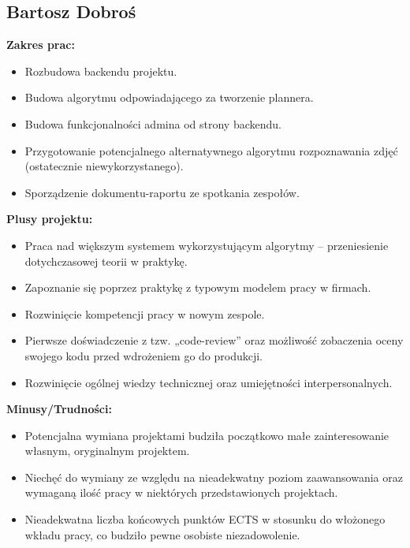 \documentclass[12pt,a4paper]{article}
\begin{document}
\subsection{Bartosz Dobroś}
\textbf{Zakres prac:}
\begin{itemize}
    \item Rozbudowa backendu projektu.
    \item Budowa algorytmu odpowiadającego za tworzenie plannera.
    \item Budowa funkcjonalności admina od strony backendu.
    \item Przygotowanie potencjalnego alternatywnego algorytmu rozpoznawania zdjęć (ostatecznie niewykorzystanego).
    \item Sporządzenie dokumentu-raportu ze spotkania zespołów.
\end{itemize}
\textbf{Plusy projektu:}
\begin{itemize}
    \item Praca nad większym systemem wykorzystującym algorytmy – przeniesienie dotychczasowej teorii w praktykę.
    \item Zapoznanie się poprzez praktykę z typowym modelem pracy w firmach.
    \item Rozwinięcie kompetencji pracy w nowym zespole.
    \item Pierwsze doświadczenie z tzw. „code-review” oraz możliwość zobaczenia oceny swojego kodu przed wdrożeniem go do produkcji.
    \item Rozwinięcie ogólnej wiedzy technicznej oraz umiejętności interpersonalnych.
\end{itemize}
\textbf{Minusy/Trudności:}
\begin{itemize}
    \item Potencjalna wymiana projektami budziła początkowo małe zainteresowanie własnym, oryginalnym projektem.
    \item Niechęć do wymiany ze względu na nieadekwatny poziom zaawansowania oraz wymaganą ilość pracy w niektórych przedstawionych projektach.
    \item Nieadekwatna liczba końcowych punktów ECTS w stosunku do włożonego wkładu pracy, co budziło pewne osobiste niezadowolenie.
\end{itemize}

\newpage
\renewcommand{\lstlistlistingname}{Spis fragmentów kodu}

\listoffigures
\vspace{1cm}
\listoftables
\vspace{1cm}
\lstlistoflistings
\end{document}
